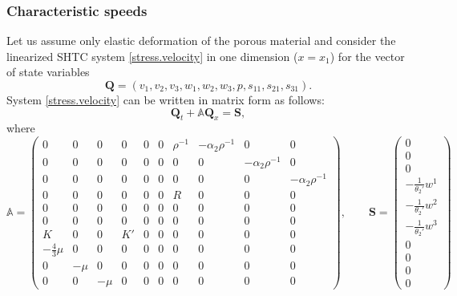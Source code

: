 \documentclass[3p,times,table]{article}
\newcommand{\QQ}{{\bm{Q}}}
\renewcommand{\SS}{{\bm{S}}}
\begin{document}
\subsubsection{Characteristic speeds}\label{sec.char.speeds}

Let us assume only elastic deformation of the porous material and consider 
the linearized SHTC system 
\eqref{stress.velocity} in one dimension ($ x = x_1 $) for the vector of state 
variables
\begin{equation}
\QQ = (v_1,v_2,v_3,w_1,w_2,w_3,p,s_{11},s_{21},s_{31}).
\end{equation}
System \eqref{stress.velocity} can be written in  matrix form as follows:
\begin{equation}\label{eqn.1Dfull}
\QQ_t + \mathbb{A} \QQ_x = \SS,
\end{equation}
where 
\begin{equation}\label{eqn.1Dfull.mat}
\mathbb{A} = \left( \begin{array}{cccccccccc}
	     0      &  0   &  0   & 0  & 0 & 0 & \rho^{-1} & -\alpha_2 \rho^{-1} &          0          
	     &          0          \\
	     0      &  0   &  0   & 0  & 0 & 0 &     0     &          0          & -\alpha_2 \rho^{-1} 
	     &          0          \\
	     0      &  0   &  0   & 0  & 0 & 0 &     0     &          0          &          0          
	     & -\alpha_2 \rho^{-1} \\
	     0      &  0   &  0   & 0  & 0 & 0 &     R     &          0          &          0          
	     &          0          \\
	     0      &  0   &  0   & 0  & 0 & 0 &     0     &          0          &          0          
	     &          0          \\
	     0      &  0   &  0   & 0  & 0 & 0 &     0     &          0          &          0          
	     &          0          \\
	     K      &  0   &  0   & K' & 0 & 0 &     0     &          0          &          0          
	     &          0          \\
	-\frac43\mu &  0   &  0   & 0  & 0 & 0 &     0     &          0          &          0          
	&          0          \\
	     0      & -\mu &  0   & 0  & 0 & 0 &     0     &          0          &          0          
	     &          0          \\
	     0      &  0   & -\mu & 0  & 0 & 0 &     0     &          0          &          0          
	     &          0
\end{array} 
\right), \qquad \SS = \left(\begin{array}{c}
0 \\ 
0 \\ 
0 \\ 
-\frac{1}{\theta_2'} w^1 \\ 
-\frac{1}{\theta_2'} w^2 \\ 
-\frac{1}{\theta_2'} w^3 \\ 
0 \\ 
0 \\ 
0 \\ 
0
\end{array} \right) 
\end{equation}
\end{document}
